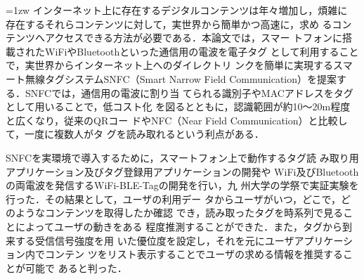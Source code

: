\renewcommand{\baselinestretch}{1}
\newcommand{\synth}{}



\begin{ヘッダ}
  \begin{center}
    \begin{minipage}{34zw}
    
\vspace{10mm}
    \parindent=1zw 
インターネット上に存在するデジタルコンテンツは年々増加し，煩雑に
存在するそれらコンテンツに対して，実世界から簡単かつ高速に，求め
るコンテンツへアクセスできる方法が必要である．本論文では，スマー
トフォンに搭載されたWiFiやBluetoothといった通信用の電波を電子タグ
として利用することで，実世界からインターネット上へのダイレクトリ
ンクを簡単に実現するスマート無線タグシステムSNFC（Smart Narrow 
Field Communication）を提案する．SNFCでは，通信用の電波に割り当
てられる識別子やMACアドレスをタグとして用いることで，低コスト化
を図るとともに，認識範囲が約10〜20m程度と広くなり，従来のQRコー
ドやNFC（Near Field Communication）と比較して，一度に複数人がタ
グを読み取れるという利点がある．

SNFCを実環境で導入するために，スマートフォン上で動作するタグ読
み取り用アプリケーション及びタグ登録用アプリケーションの開発や
WiFi及びBluetoothの両電波を発信するWiFi-BLE-Tagの開発を行い，九
州大学の学祭で実証実験を行った．その結果として，ユーザの利用デー
タからユーザがいつ，どこで，どのようなコンテンツを取得したか確認
でき，読み取ったタグを時系列で見ることによってユーザの動きをある
程度推測することができた．また，タグから到来する受信信号強度を用
いた優位度を設定し，それを元にユーザアプリケーション内でコンテン
ツをリスト表示することでユーザの求める情報を推奨することが可能で
あると判った．

\vspace{8mm}

\end{minipage}
\end{center}
\end{ヘッダ}
 


